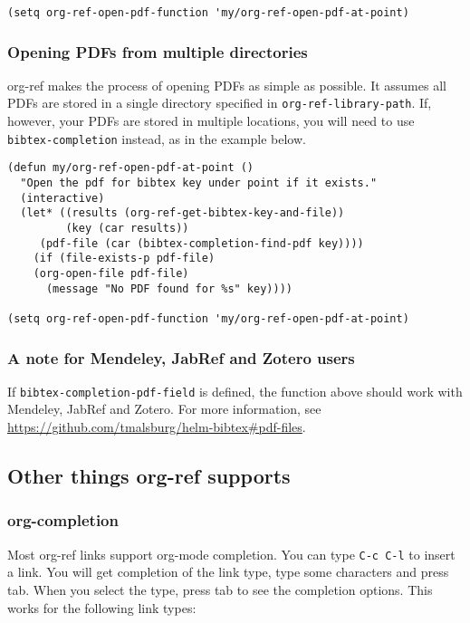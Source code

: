 \documentclass[11pt]{article}
\begin{document}
{\begin{verbatim}
(setq org-ref-open-pdf-function 'my/org-ref-open-pdf-at-point)
\end{verbatim}

\subsubsection{Opening PDFs from multiple directories}
\label{sec-3-2-2}

org-ref makes the process of opening PDFs as simple as possible. It assumes all PDFs are stored in a single directory specified in \verb~org-ref-library-path~. If, however, your PDFs are stored in multiple locations, you will need to use \verb~bibtex-completion~ instead, as in the example below.

\begin{verbatim}
(defun my/org-ref-open-pdf-at-point ()
  "Open the pdf for bibtex key under point if it exists."
  (interactive)
  (let* ((results (org-ref-get-bibtex-key-and-file))
         (key (car results))
     (pdf-file (car (bibtex-completion-find-pdf key))))
    (if (file-exists-p pdf-file)
    (org-open-file pdf-file)
      (message "No PDF found for %s" key))))

(setq org-ref-open-pdf-function 'my/org-ref-open-pdf-at-point)
\end{verbatim}

\subsubsection{A note for Mendeley, JabRef and Zotero users}
\label{sec-3-2-3}

If \verb~bibtex-completion-pdf-field~ is defined, the function above should work with Mendeley, JabRef and Zotero. For more information, see \url{https://github.com/tmalsburg/helm-bibtex#pdf-files}.

\subsection{Other things org-ref supports}
\label{sec-3-3}
\subsubsection{org-completion}
\label{sec-3-3-1}
 

Most org-ref links support org-mode completion. You can type \verb~C-c C-l~ to insert a link. You will get completion of the link type, type some characters and press tab. When you select the type, press tab to see the completion options. This works for the following link types:

}
\end{document}
